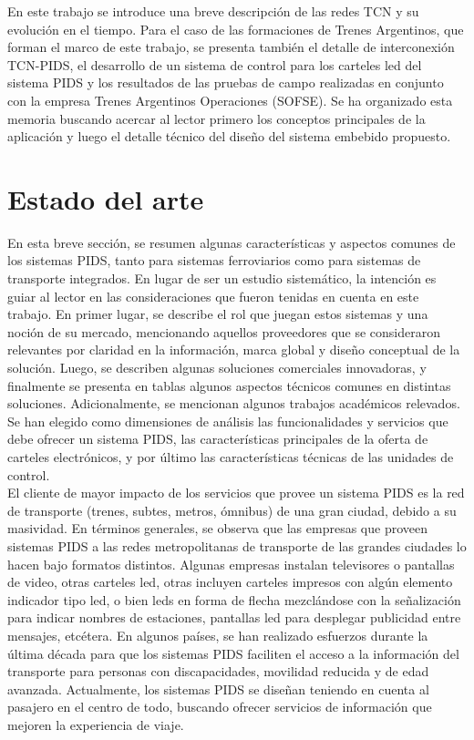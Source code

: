  En este trabajo se introduce una breve descripción de las redes TCN y su evolución en el tiempo. Para el caso de las formaciones de Trenes Argentinos, que forman el marco de este trabajo, se presenta también el detalle de interconexión TCN-PIDS, el desarrollo de un sistema de control para los carteles led del sistema PIDS y los resultados de las pruebas de campo realizadas en conjunto con la empresa Trenes Argentinos Operaciones (SOFSE). Se ha organizado esta memoria buscando acercar al lector primero los conceptos principales de la aplicación y luego el detalle técnico del diseño del sistema embebido propuesto. \\

\section{Estado del arte}

En esta breve sección, se resumen algunas características y aspectos comunes de los sistemas PIDS, tanto para sistemas ferroviarios como para sistemas de transporte integrados. En lugar de ser un estudio sistemático, la intención es guiar al lector en las consideraciones que fueron tenidas en cuenta en este trabajo. En primer lugar, se describe el rol que juegan estos sistemas y una noción de su mercado, mencionando aquellos proveedores que se consideraron relevantes por claridad en la información, marca global y diseño conceptual de la solución. Luego, se describen algunas soluciones comerciales innovadoras, y finalmente se presenta en tablas algunos aspectos técnicos comunes en distintas soluciones. Adicionalmente, se mencionan algunos trabajos académicos relevados. Se han elegido como dimensiones de análisis las funcionalidades y servicios que debe ofrecer un sistema PIDS, las características principales de la oferta de carteles electrónicos, y por último las características técnicas de las unidades de control. \\


El cliente de mayor impacto de los servicios que provee un sistema PIDS es la red de transporte (trenes, subtes, metros, ómnibus) de una gran ciudad, debido a su masividad. En términos generales, se observa que las empresas que proveen sistemas PIDS a las redes metropolitanas de transporte de las grandes ciudades lo hacen bajo formatos distintos. Algunas empresas instalan televisores o pantallas de video, otras carteles led, otras incluyen carteles impresos con algún elemento indicador tipo led, o bien leds en forma de flecha mezclándose con la señalización para indicar nombres de estaciones, pantallas led para desplegar publicidad entre mensajes, etcétera. En algunos países, se han realizado esfuerzos durante la última década para que los sistemas PIDS faciliten el acceso a la información del transporte para personas con discapacidades, movilidad reducida y de edad avanzada. Actualmente, los sistemas PIDS se diseñan teniendo en cuenta al pasajero en el centro de todo, buscando ofrecer servicios de información que mejoren la experiencia de viaje.\\

